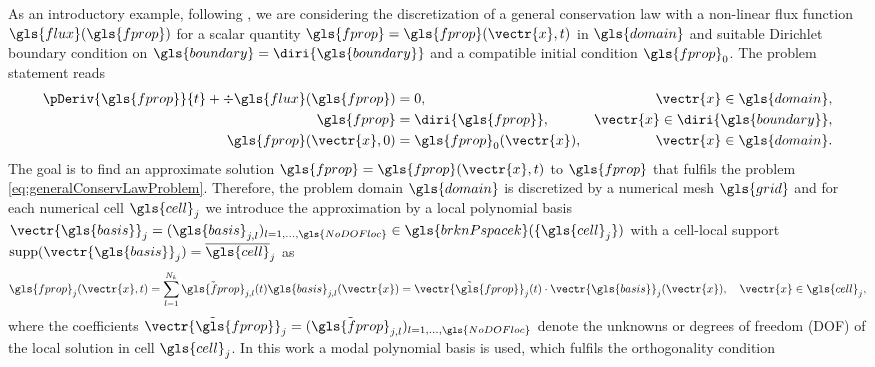 \label{sec:discretDGmethod}

As an introductory example, following \textcite{hesthaven_nodal_2008}, we are considering the discretization of a general conservation law with a non-linear flux function $\gls{flux}(\gls{fprop})$ for a scalar quantity $\gls{fprop} = \gls{fprop}(\vectr{x},t)$ in $\gls{domain}$ and suitable Dirichlet boundary condition on $\gls{boundary} = \diri{\gls{boundary}}$ and a compatible initial condition $\gls{fprop}_0$. The problem statement reads
\begin{subequations}
	\begin{align}
		\pDeriv{\gls{fprop}}{t} + \div{\gls{flux}(\gls{fprop})} & = 0,                        & \vectr{x} \in  \gls{domain},    \label{eq:generalConservLaw} \\
		\gls{fprop}                                             & = \diri{\gls{fprop}},       & \vectr{x} \in \diri{\gls{boundary}},
		\label{eq:generalConservLawBC}                                                                                                                       \\
		\gls{fprop}(\vectr{x}, 0)                               & = \gls{fprop}_0(\vectr{x}), & \vectr{x} \in  \gls{domain}.
		\label{eq:generalConservLawIC}
	\end{align}
	\label{eq:generalConservLawProblem}
\end{subequations}
The goal is to find an approximate solution $\gls{fprop} = \gls{fprop}(\vectr{x},t)$ to $\gls{fprop}$ that fulfils the problem \eqref{eq:generalConservLawProblem}. Therefore, the problem domain $\gls{domain}$ is discretized by a numerical mesh $\gls{grid}$ and for each numerical cell $\gls{cell}_j$ we introduce the approximation by a local polynomial basis $\vectr{\gls{basis}}_j = (\gls{basis}_{j,l})_{l=1,...,\gls{NoDOFloc}} \in \gls{brknPspacek}(\{\gls{cell}_j\})$ with a cell-local support $\textrm{supp}(\vectr{\gls{basis}}_j) = \overline{\gls{cell}}_j$ as
\begin{equation}
	\gls{fprop}_j(\vectr{x},t) = \sum_{l=1}^{N_k} \tilde{\gls{fprop}}_{j,l}(t) \gls{basis}_{j,l}(\vectr{x}) = \tilde{\vectr{\gls{fprop}}}_{j}(t) \cdot \vectr{\gls{basis}}_{j}(\vectr{x}), \quad \vectr{x} \in \gls{cell}_j,
	\label{eq:localApprox}
\end{equation}
where the coefficients $\tilde{\vectr{\gls{fprop}}}_{j} = (\tilde{\gls{fprop}}_{j,l})_{l=1,...,\gls{NoDOFloc}}$ denote the unknowns or degrees of freedom (DOF) of the local solution in cell $\gls{cell}_j$. In this work a modal polynomial basis is used, which fulfils the orthogonality condition
